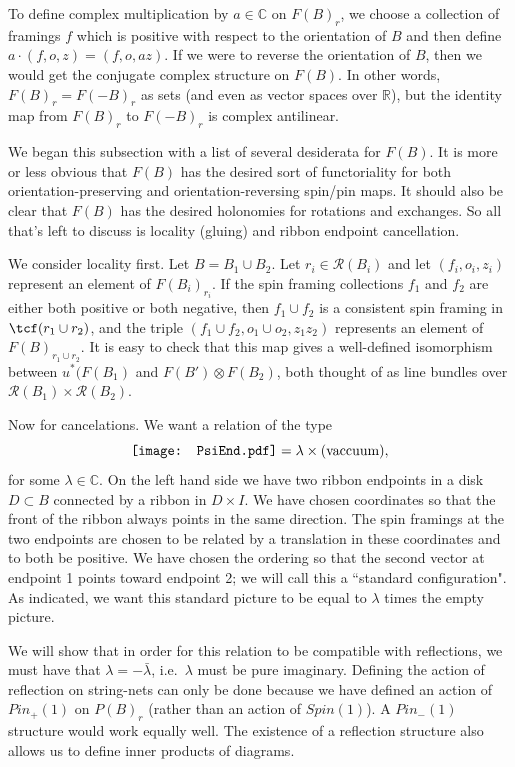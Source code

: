 \documentclass[12pt,a4paper]{article}
\newcommand{\cc}{\mathbb{C}}
\newcommand{\rr}{\mathbb{R}}
\newcommand{\mcr}{\mathcal{R}}
\newcommand\be            {\begin{equation}}
\newcommand\ee            {\end{equation}}
\newcommand{\PsiEnd}{\mathord{\vcenter{\hbox{\texttt{[image: PsiEnd.pdf]}}}}}
\begin{document}
To define complex multiplication by $a\in\cc$ on $F(B)_r$, we choose a collection of framings $f$ which is positive
with respect to the orientation of $B$ and then define $a\cdot (f, o, z) = (f, o, az)$.
If we were to reverse the orientation of $B$, then we would get the conjugate complex structure on $F(B)$.
In other words, $F(B)_r = F(-B)_r$ as sets (and even as vector spaces over $\rr$), but the identity map from
$F(B)_r$ to $F(-B)_r$ is complex antilinear.

\medskip

We began this subsection with a list of several desiderata for $F(B)$.
It is more or less obvious that $F(B)$ has the desired sort of functoriality for both orientation-preserving
and orientation-reversing spin/pin maps.
It should also be clear that $F(B)$ has the desired holonomies for rotations and exchanges.
So all that's left to discuss is locality (gluing) and ribbon endpoint cancellation.

\medskip

We consider locality first.
Let $B = B_1 \cup B_2$.
Let $r_i \in \mcr(B_i)$ and let $(f_i, o_i, z_i)$ represent an element of $F(B_i)_{r_i}$.
If the spin framing collections $f_1$ and $f_2$ are either both positive or both negative, then
$f_1 \cup f_2$ is a consistent spin framing in $\tcf(r_1 \cup r_2)$, and the triple
$(f_1 \cup f_2, o_1\cup o_2, z_1 z_2)$ represents an element of $F(B)_{r_1\cup r_2}$.
It is easy to check that this map gives a well-defined  isomorphism between $u^*(F(B_1)$ and $F(B')\otimes F(B_2)$, both thought of as line bundles over $\mcr(B_1)\times\mcr(B_2)$.

\medskip

Now for cancelations.
We want a relation of the type 
\be \label{eval_psi_semicirc}
\PsiEnd  = \lambda \times \text{(vaccuum)},
 \ee
for some $\lambda \in \cc$. 
On the left hand side we have two ribbon endpoints in a disk $D \subset B$ connected by a ribbon in $D\times I$.
We have chosen coordinates so that the front of the ribbon always points in the same direction.
The spin framings at the two endpoints are chosen to be related by a translation in these coordinates
and to both be positive.
We have chosen the ordering so that the second vector at endpoint 1 points toward endpoint 2;
we will call this a ``standard configuration".
As indicated, we want this standard picture to be equal to $\lambda$ times the empty picture.

We will show that in order for this relation to be compatible with reflections, 
we must have that $\lambda = -\bar\lambda$, i.e.\ $\lambda$ must be pure imaginary.
Defining the action of reflection on string-nets can only be done because we have defined an action of $Pin_+(1)$ on $P(B)_r$ (rather than an action of $Spin(1)$). 
A $Pin_-(1)$ structure would work equally well. 
The existence of a reflection structure also allows us to define inner products of diagrams. 
\end{document}
